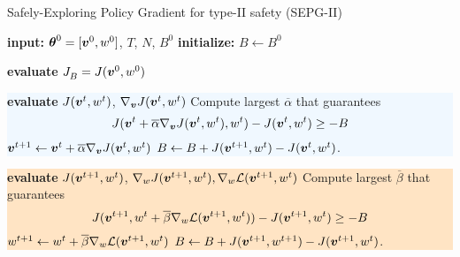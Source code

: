 \begin{algorithm}[t]
\caption{Safely-Exploring Policy Gradient for type-II safety (SEPG-II)}
    \label{alg:sepg-II}
    \begin{algorithmic}[1] 
	\State \textbf{input:} $\vtheta^0 = [\vv^0, w^0]$, $T$, $N$, $B^0$
        \State \textbf{initialize:} $B \gets B^0$
        
        \State \textbf{evaluate} $\jbase[] = J(\vv^0, w^0)$
        \State\newline
        \hspace*{-\fboxsep}\colorbox{aliceblue}{\parbox{\linewidth}{
            \State \textbf{evaluate} $J(\vv^t,w^t)$, $\nabla_{\vv}{J(\vv^t,w^t)}$ 
			\State Compute largest $\overline{\alpha}$ that guarantees \[J(\vv^t + \overline{\alpha} \nabla_{\vv}J(\vv^t, w^t), w^t) - J(\vv^t, w^t) \geq -B\]
            \State $\vv^{t+1} \gets \vv^t + \overline{\alpha}\nabla_{\vv}{J(\vv^t, w^t)}$  
            \State $B \gets B + J(\vv^{t+1}, w^t) - J(\vv^t, w^t)$.}}

\State\newline
\hspace*{-\fboxsep}\colorbox{bisque}{\parbox{\linewidth}{
            
            \State \textbf{evaluate} $J(\vv^{t+1}, w^t)$, $\nabla_{w}{J(\vv^{t+1}, w^t)}, \gradDelta(\vv^{t+1},w^t)$ 
            \State Compute largest $\overline{\beta}$ that guarantees \[J(\vv^{t+1}, w^t + \overline{\beta} \gradDelta(\vv^{t+1}, w^t)) - J(\vv^{t+1}, w^t) \geq -B \]
            \State $w^{t+1} \gets w^t + \overline{ \beta}\gradDelta(\vv^{t+1},w^t)$             
            \State $B \gets B + J(\vv^{t+1}, w^{t+1}) - J(\vv^{t+1}, w^t)$. }}
        \EndFor
    \end{algorithmic}
\end{algorithm}


